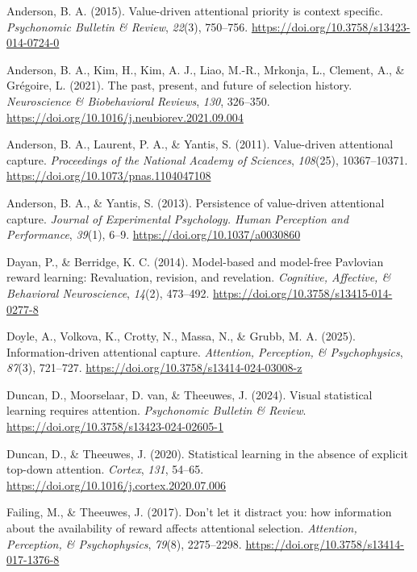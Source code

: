 \documentclass[
  jou,
  floatsintext,
  longtable,
  nolmodern,
  notxfonts,
  notimes,
  colorlinks=true,linkcolor=blue,citecolor=blue,urlcolor=blue]{apa7}
\newlength{\cslhangindent}
\newenvironment{CSLReferences}[2] %
 {\begin{list}{}{%
  \setlength{\itemindent}{0pt}
  \setlength{\leftmargin}{0pt}
  \setlength{\parsep}{0pt}
  \ifodd #1
   \setlength{\leftmargin}{\cslhangindent}
   \setlength{\itemindent}{-1\cslhangindent}
  \fi
  \setlength{\itemsep}{#2\baselineskip}}}
 {\end{list}}
\begin{document}
\label{refs}
\begin{CSLReferences}{1}{0}
Anderson, B. A. (2015). Value-driven attentional priority is context
specific. \emph{Psychonomic Bulletin \& Review}, \emph{22}(3), 750--756.
\url{https://doi.org/10.3758/s13423-014-0724-0}

Anderson, B. A., Kim, H., Kim, A. J., Liao, M.-R., Mrkonja, L., Clement,
A., \& Grégoire, L. (2021). The past, present, and future of selection
history. \emph{Neuroscience \& Biobehavioral Reviews}, \emph{130},
326--350. \url{https://doi.org/10.1016/j.neubiorev.2021.09.004}

Anderson, B. A., Laurent, P. A., \& Yantis, S. (2011). Value-driven
attentional capture. \emph{Proceedings of the National Academy of
Sciences}, \emph{108}(25), 10367--10371.
\url{https://doi.org/10.1073/pnas.1104047108}

Anderson, B. A., \& Yantis, S. (2013). Persistence of value-driven
attentional capture. \emph{Journal of Experimental Psychology. Human
Perception and Performance}, \emph{39}(1), 6--9.
\url{https://doi.org/10.1037/a0030860}

Dayan, P., \& Berridge, K. C. (2014). Model-based and model-free
Pavlovian reward learning: Revaluation, revision, and revelation.
\emph{Cognitive, Affective, \& Behavioral Neuroscience}, \emph{14}(2),
473--492. \url{https://doi.org/10.3758/s13415-014-0277-8}

Doyle, A., Volkova, K., Crotty, N., Massa, N., \& Grubb, M. A. (2025).
Information-driven attentional capture. \emph{Attention, Perception, \&
Psychophysics}, \emph{87}(3), 721--727.
\url{https://doi.org/10.3758/s13414-024-03008-z}

Duncan, D., Moorselaar, D. van, \& Theeuwes, J. (2024). Visual
statistical learning requires attention. \emph{Psychonomic Bulletin \&
Review}. \url{https://doi.org/10.3758/s13423-024-02605-1}

Duncan, D., \& Theeuwes, J. (2020). Statistical learning in the absence
of explicit top-down attention. \emph{Cortex}, \emph{131}, 54--65.
\url{https://doi.org/10.1016/j.cortex.2020.07.006}

Failing, M., \& Theeuwes, J. (2017). Don{'}t let it distract you: how
information about the availability of reward affects attentional
selection. \emph{Attention, Perception, \& Psychophysics}, \emph{79}(8),
2275--2298. \url{https://doi.org/10.3758/s13414-017-1376-8}


\end{CSLReferences}
\end{document}
